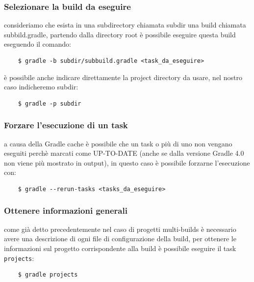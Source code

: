 \subsubsection{Selezionare la build da eseguire} consideriamo che esista in una subdirectory chiamata subdir una build chiamata subbild.gradle, partendo dalla directory root è possibile eseguire questa build eseguendo il comando:
\begin{verbatim}
    $ gradle -b subdir/subbuild.gradle <task_da_eseguire> \end{verbatim}
è possibile anche indicare direttamente la project directory da usare, nel nostro caso indicheremo subdir:
\begin{verbatim}
    $ gradle -p subdir  \end{verbatim}

\subsubsection{Forzare l'esecuzione di un task} a causa della Gradle cache è possibile che un task o più di uno non vengano eseguiti perchè marcati come UP-TO-DATE (anche se dalla versione Gradle 4.0 non viene più mostrato in output), in questo caso è possibile forzarne l'esecuzione con:
\begin{verbatim}
    $ gradle --rerun-tasks <tasks_da_eseguire> \end{verbatim}

\subsubsection{Ottenere informazioni generali} come già detto precedentemente nel caso di progetti multi-builds è necessario avere una descrizione di ogni file di configurazione della build, per ottenere le informazioni sul progetto corrispondente alla build è possibile eseguire il task \texttt{projects}:
\begin{verbatim}
    $ gradle projects \end{verbatim}

